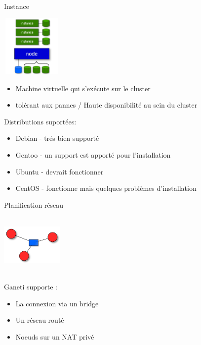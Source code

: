 \begin{frame}{Instance}
\begin{center}
  \includegraphics[width=3cm,height=3cm]{images_presentation/instance.png}
\end{center}
\begin{itemize}
\item Machine virtuelle qui s'exécute sur le cluster
\pause
\item tolérant aux pannes / Haute disponibilité au sein du cluster
\end{itemize}
\end{frame}

\begin{frame}
Distributions suportées:\\
\begin{itemize}
\item Debian - trés bien supporté
\pause
\item Gentoo - un support est apporté pour l'installation
\pause
\item Ubuntu - devrait fonctionner
\pause
\item CentOS - fonctionne mais quelques problèmes d'installation
\end{itemize}
\end{frame}

\begin{frame}{Planification réseau}
\begin{center}
  \includegraphics[width=3cm,height=3cm]{images_presentation/network.png}
\end{center}
\begin{block}{Ganeti supporte :}
\begin{itemize}
\item La connexion via un bridge
\pause
\item Un réseau routé
\pause
\item Noeuds sur un NAT privé
\end{itemize}
\end{block}
\end{frame}

